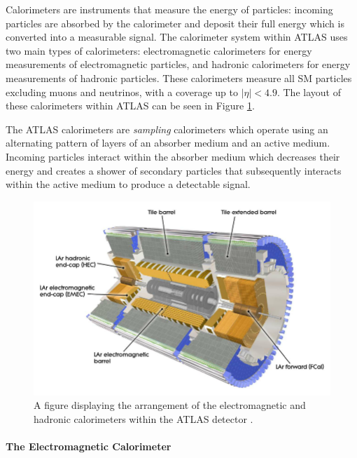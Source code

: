 \documentclass[12pt,a4paper,epsf,portrait,times,epsfig]{article}
\begin{document}
		Calorimeters are instruments that measure the energy of particles: incoming particles are absorbed by the calorimeter and deposit their full energy which is converted into a measurable signal. The calorimeter system within ATLAS uses two main types of calorimeters: electromagnetic calorimeters for energy measurements of electromagnetic particles, and hadronic calorimeters for energy measurements of hadronic particles. These calorimeters measure all SM particles excluding muons and neutrinos, with a coverage up to $|\eta| < 4.9$. The layout of these calorimeters within ATLAS can be seen in Figure \ref{Fig:ATLASCalorimeters}. \par

		The ATLAS calorimeters are \textit{sampling} calorimeters which operate using an alternating pattern of layers of an absorber medium and an active medium. Incoming particles interact within the absorber medium which decreases their energy and creates a shower of secondary particles that subsequently interacts within the active medium to produce a detectable signal.  

		\begin{figure}
			\centering
			\includegraphics[scale=0.4]{ATLAS_Calorimeters}
			\caption{A figure displaying the arrangement of the electromagnetic and hadronic calorimeters within the ATLAS detector \cite{AtlasCalImage}.}
			\label{Fig:ATLASCalorimeters} 
		\end{figure} 

		\paragraph{The Electromagnetic Calorimeter}\label{Section:ECal}
		\mbox{}\\
		\mbox{} \\
\end{document}
